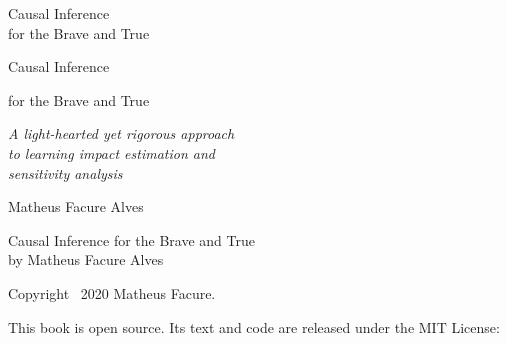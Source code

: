
\thispagestyle{empty}
\vspace*{2.2in}
\begingroup\raggedright
{\headinglightfont\fontsize{24}{29}\selectfont\color{ink}Causal Inference\\for the Brave and True\par}
\vspace{16pt}{\color{accent}\rule{2.2em}{1.6pt}}\par
\endgroup
\clearpage
\thispagestyle{empty}\null
\clearpage

\thispagestyle{empty}
\vspace*{1.05in}
\begingroup\raggedright
{\headinglightfont\fontsize{44}{48}\selectfont\color{ink}Causal Inference\par}
\vspace{5pt}
{\headingfont\fontsize{27}{32}\selectfont\color{accent}for the Brave and True\par}
\vspace{24pt}{\color{accent}\rule{2.4em}{2pt}}\par\vspace{22pt}
{\itshape\fontsize{13.5}{18}\selectfont\color{inkgray}A light-hearted yet rigorous approach\\
to learning impact estimation and\\sensitivity analysis\par}
\vfill
{\headingmediumfont\fontsize{17}{21}\selectfont\color{ink}Matheus Facure Alves\par}
\vspace{0.35in}
\endgroup
\clearpage

\thispagestyle{empty}
\vspace*{\fill}
\begingroup\raggedright\fontsize{8.5}{11.5}\selectfont\color{ink}
\setlength{\parskip}{6pt}
{\headingfont Causal Inference for the Brave and True}\\
by Matheus Facure Alves

Copyright \textcopyright\ 2020 Matheus Facure.

This book is open source. Its text and code are released under the MIT License:


